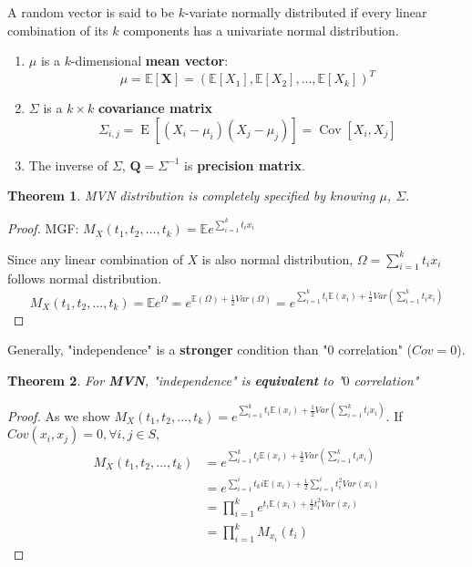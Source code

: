 \documentclass[11pt,a4paper]{article}
\newtheorem{theorem}{Theorem}
\begin{document}
A random vector is said to be $k$-variate normally distributed if every linear combination of its $k$ components has a univariate normal distribution.
\begin{enumerate}[(1)]
    \item $\mu$ is a $k$-dimensional \textbf{mean vector}: $$\mu=\mathbb{E}[\mathbf{X}]=(\mathbb{E}[X_1],\mathbb{E}[X_2],...,\mathbb{E}[X_k])^T$$
    \item $\Sigma$ is a $k\times k$ \textbf{covariance matrix}$${\displaystyle \Sigma _{i,j}=\operatorname {E} [(X_{i}-\mu _{i})(X_{j}-\mu _{j})]=\operatorname {Cov} [X_{i},X_{j}]}$$
    \item The inverse of $\Sigma$, ${\boldsymbol {Q}}={\Sigma }^{-1}$ is \textbf{precision matrix}.
\end{enumerate}
\begin{theorem}
    MVN distribution is completely specified by knowing $\mu$, $\Sigma$.
\end{theorem}
\begin{proof}
MGF: $M_X(t_1,t_2,...,t_k)=\mathbb{E}e^{\sum_{i=1}^k t_ix_i}$

Since any linear combination of $X$ is also normal distribution, $\Omega=\sum_{i=1}^k t_ix_i$ follows normal distribution.
$$M_X(t_1,t_2,...,t_k)=\mathbb{E}e^\Omega=e^{\mathbb{E}(\Omega)+\frac{1}{2}Var(\Omega)}=e^{\sum_{i=1}^kt_i \mathbb{E}(x_i)+\frac{1}{2}Var(\sum_{i=1}^k t_ix_i)}$$
\end{proof}

Generally, "independence" is a \textbf{stronger} condition than "$0$ correlation" ($Cov=0$).
\begin{theorem}
    For \textbf{MVN}, "independence" is \textbf{equivalent} to "$0$ correlation"
\end{theorem}
\begin{proof}
As we show $M_X(t_1,t_2,...,t_k)=e^{\sum_{i=1}^kt_i \mathbb{E}(x_i)+\frac{1}{2}Var(\sum_{i=1}^k t_ix_i)}$. If $Cov(x_i,x_j)=0,\forall i,j\in S$,
\begin{equation}
    \begin{aligned}
        M_X(t_1,t_2,...,t_k)&=e^{\sum_{i=1}^kt_i \mathbb{E}(x_i)+\frac{1}{2}Var(\sum_{i=1}^k t_ix_i)}\\
        &=e^{\sum_{i=1}^it_ki \mathbb{E}(x_i)+\frac{1}{2}\sum_{i=1}^it_i^2Var(x_i)}\\
        &=\prod_{i=1}^ke^{t_i\mathbb{E}(x_i)+\frac{1}{2}t_i^2Var(x_i)}\\
        &=\prod_{i=1}^kM_{x_i}(t_i)
    \end{aligned}
    \nonumber
\end{equation}
\end{proof}
\end{document}
